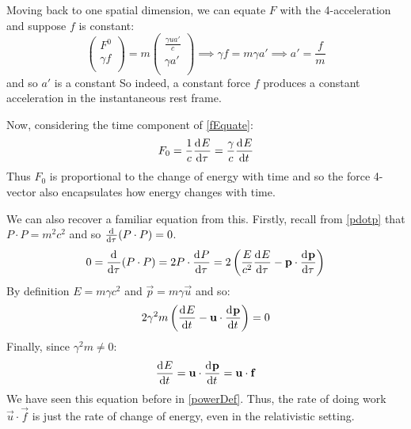 \documentclass[../main.tex]{subfiles}
\begin{document}
Moving back to one spatial dimension, we can equate $F$ with the 4-acceleration and suppose $f$ is constant:
\[
  \begin{pmatrix}
  F^{0} \\
  \gamma f \\
  \end{pmatrix} = m\begin{pmatrix}
  \frac{\gamma u a'}{c} \\
  \gamma a' \\
  \end{pmatrix} \implies \gamma f = m\gamma a' \implies a' = \frac{f}{m}
\]
and so $a'$ is a constant
So indeed, a constant force $f$ produces a constant acceleration in the instantaneous rest frame.

Now, considering the time component of \cref{fEquate}:
\[
  F_0 = \frac{1}{c}\deriv{E}{\tau} = \frac{\gamma}{c}\deriv{E}{t}
\]
Thus $F_0$ is proportional to the change of energy with time and so the force 4-vector also encapsulates how energy changes with time.

We can also recover a familiar equation from this.
Firstly, recall from \cref{pdotp} that $P \cdot P = m^2 c^2$ and so $\deriv{}{\tau}(P \cdot P) = 0$.
\[
  0 = \deriv{}{\tau}(P \cdot P) = 2 P \cdot \deriv{P}{\tau} = 2\left(\frac{E}{c^2}\deriv{E}{\tau} - \vec{p} \cdot \deriv{\vec{p}}{\tau}\right)
\]
By definition $E = m\gamma c^2$ and $\vec{p} = m\gamma \vec{u}$ and so:
\begin{align*}
  2\gamma^2m\left(\deriv{E}{t} - \vec{u} \cdot \deriv{\vec{p}}{t}\right) = 0
\end{align*}
Finally, since $\gamma^2 m \neq 0$:
\[
  \deriv{E}{t} = \vec{u} \cdot \deriv{\vec{p}}{t} = \vec{u} \cdot \vec{f}
\]
We have seen this equation before in \cref{powerDef}.
Thus, the rate of doing work $\vec{u} \cdot \vec{f}$ is just the rate of change of energy, even in the relativistic setting.
\end{document}
